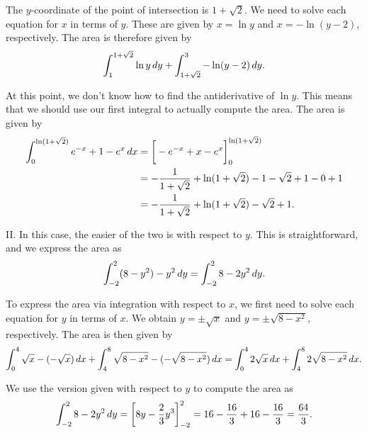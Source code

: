 \documentclass[]{ximera}
\begin{document}
\begin{freeResponse}
\begin{image}
\end{image}

The $y$-coordinate of the point of intersection is $1+\sqrt{2}$. We need to solve each equation for $x$ in terms of $y$. These are given by $x=\ln y$ and $x=-\ln(y-2)$, respectively. The area is therefore given by
$$
\int_1^{1+\sqrt{2}} \ln y \mathop{}\!d y + \int_{1+\sqrt{2}}^3 -\ln(y-2) \mathop{}\!d y.
$$

At this point, we don't know how to find the antiderivative of $\ln y$. This means that we should use our first integral to actually compute the area. The area is given by
\begin{align*}
\int_0^{\ln (1+ \sqrt{2})} e^{-x}+1-e^x \mathop{}\!d x &= \bigg[ -e^{-x} + x - e^x \bigg]_0^{\ln(1+\sqrt{2})} \\
&= -\frac{1}{1+\sqrt{2}} + \ln(1+\sqrt{2}) - 1 - \sqrt{2} + 1 - 0 + 1 \\
&= -\frac{1}{1+\sqrt{2}} + \ln(1+\sqrt{2})  - \sqrt{2} + 1.
\end{align*}

II. In this case, the easier of the two is with respect to $y$. This is straightforward, and we express the area as 
$$
\int_{-2}^2 (8-y^2) - y^2 \mathop{}\!d y = \int_{-2}^2 8 - 2y^2 \mathop{}\!d y.
$$

To express the area via integration with respect to $x$, we first need to solve each equation for $y$ in terms of $x$. We obtain $y=\pm \sqrt{x}$ and $y=\pm\sqrt{8-x^2}$, respectively. The area is then given by
$$
\int_0^4 \sqrt{x} - (-\sqrt{x}) \mathop{}\!d x + \int_4^8 \sqrt{8-x^2} - (-\sqrt{8-x^2}) \mathop{}\!d x = \int_0^4 2 \sqrt{x} \mathop{}\!d x + \int_4^8 2 \sqrt{8-x^2} \mathop{}\!d x.
$$

We use the version given with respect to $y$ to compute the area as
$$
\int_{-2}^2 8 - 2y^2 \mathop{}\!d y = \bigg[ 8y - \frac{2}{3} y^3 \bigg]_{-2}^2  = 16 - \frac{16}{3} + 16 - \frac{16}{3} = \frac{64}{3}.
$$
\end{freeResponse}
\end{document}
